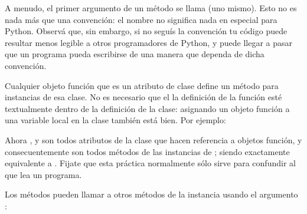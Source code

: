 \documentclass[a4,10pt,spanish]{sphinxmanual}
\begin{document}
\sphinxAtStartPar
A menudo, el primer argumento de un método se llama  (uno mismo).  Esto no es nada más que una convención: el nombre  no significa nada en especial para Python.  Observá que, sin embargo, si no seguís la convención tu código puede resultar menos legible a otros programadores de Python, y puede llegar a pasar que un programa  pueda escribirse de una manera que dependa de dicha convención.

\sphinxAtStartPar
Cualquier objeto función que es un atributo de clase define un método para instancias de esa clase.  No es necesario que el la definición de la función esté textualmente dentro de la definición de la clase: asignando un objeto función a una variable local en la clase también está bien.  Por ejemplo:

\begin{sphinxVerbatim}[commandchars=\\\{\}]
   
      

 
      

     
         

      
\end{sphinxVerbatim}

\sphinxAtStartPar
Ahora ,  y  son todos atributos de la clase  que hacen referencia a objetos función, y consecuentemente son todos métodos de las instancias de ;  siendo exactamente equivalente a . Fijate que esta práctica normalmente sólo sirve para confundir al que lea un programa.

\sphinxAtStartPar
Los métodos pueden llamar a otros métodos de la instancia usando el argumento :
\end{document}
